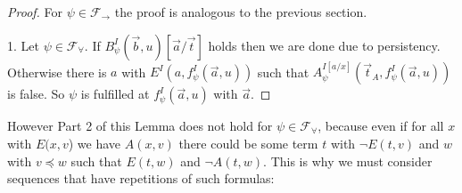 \documentclass[a4paper,UKenglish,cleveref, autoref, thm-restate]{lipics-v2021}
\begin{document}
\begin{proof}
	For $\psi\in\mathcal F_\to$ the proof is analogous to the previous section.
	
	1. Let $\psi\in\mathcal F_\forall$. If $B^I_\psi(\vec b, u)[\vec a/\vec t]$ holds then we are done due to persistency. Otherwise there is $a$ with $E^I(a, f^I_\psi(\vec a, u))$ such that $A^{I[a/x]}_\psi(\vec t_A, f^I_\psi(\vec a, u))$ is false. So $\psi$ is fulfilled at $f^I_\psi(\vec a, u)$ with $\vec a$.
\end{proof}

However Part 2 of this Lemma does not hold for $\psi\in\mathcal F_\forall$, because even if for all $x$ with $E(x, v$) we have $A(x, v)$ there could be some term $t$ with $\neg E(t, v)$ and $w$ with $v\preceq w$ such that $E(t, w)$ and $\neg A(t, w)$. This is why we must consider sequences that have repetitions of such formulas:
\end{document}

